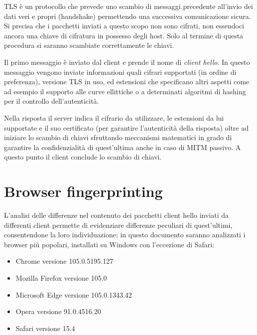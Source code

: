 TLS è un protocollo che prevede uno scambio di messaggi precedente all'invio dei dati veri e propri (handshake) permettendo una successiva comunicazione sicura. Si precisa che i pacchetti inviati a questo scopo non sono cifrati, non essendoci ancora una chiave di cifratura in possesso degli host. Solo al termine di questa procedura si saranno scambiate correttamente le chiavi.

Il primo messaggio è inviato dal client e prende il nome di \textit{client hello}. In questo messaggio vengono inviate informazioni quali cifrari supportati (in ordine di preferenza), versione TLS in uso, ed estensioni che specificano altri aspetti come ad esempio il supporto alle curve ellittiche o a determinati algoritmi di hashing per il controllo dell'autenticità.

Nella risposta il server indica il cifrario da utilizzare, le estensioni da lui supportate e il suo certificato (per garantire l'autenticità della risposta) oltre ad iniziare lo scambio di chiavi sfruttando meccanismi matematici in grado di garantire la confidenzialità di quest'ultima anche in caso di MITM passivo.
A questo punto il client conclude lo scambio di chiavi.

\section{Browser fingerprinting}
L'analisi delle differenze nel contenuto dei pacchetti client hello inviati da differenti client permette di evidenziare differenze peculiari di quest'ultimi, consentendone la loro individuazione; in questo documento saranno analizzati i browser più popolari, installati su Windows con l'eccezione di Safari:
\begin{itemize}
	\item Chrome versione 105.0.5195.127
	\item Mozilla Firefox versione 105.0
	\item Microsoft Edge versione 105.0.1343.42
	\item Opera versione 91.0.4516.20
	\item Safari versione 15.4
\end{itemize}

